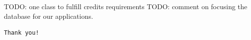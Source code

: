 \documentclass{beamer}
\begin{document}

     TODO: one class to fulfill credits requirements
     TODO: comment on focusing the database for our applications.



\begin{frame}{}
\begin{center}
    \texttt{Thank you!}
\end{center}
\end{frame}
\end{document}
